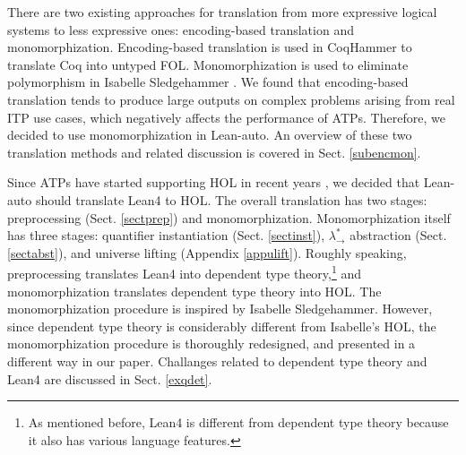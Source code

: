   There are two existing approaches for translation from more expressive
  logical systems to less expressive ones: encoding-based translation and monomorphization.
  Encoding-based translation is used in CoqHammer \cite{Czajka2018HammerFC}
  to translate Coq into untyped FOL. Monomorphization is used to
  eliminate polymorphism in Isabelle Sledgehammer \cite{Blanchette2016HammeringTQ,MonoPaper,Paulson2012ThreeYO}.
  We found that encoding-based translation tends to produce large outputs
  on complex problems arising from real ITP use cases, which negatively affects the performance of ATPs.
  Therefore, we decided to use monomorphization in Lean-auto. An overview of these two
  translation methods and related discussion is covered in Sect. \ref{subencmon}.

  Since ATPs have started supporting HOL in recent years \cite{HOVampire,ZipperpositionMakeWork,HOEProver},
  we decided that Lean-auto should translate Lean4 to HOL. The overall translation has
  two stages: preprocessing (Sect. \ref{sectprep}) and monomorphization.
  Monomorphization itself has three stages: quantifier instantiation (Sect. \ref{sectinst}),
  $\lambda_\to^*$ abstraction (Sect. \ref{sectabst}), and universe lifting (Appendix \ref{appulift}).
  Roughly speaking, preprocessing translates Lean4 into dependent type
  theory,\footnote{As mentioned before, Lean4 is different from
  dependent type theory because it also has various language features.}
  and monomorphization translates dependent type theory into HOL.
  The monomorphization procedure is inspired by Isabelle Sledgehammer.
  However, since dependent type theory is considerably different from
  Isabelle's HOL, the monomorphization procedure is thoroughly redesigned,
  and presented in a different way in our paper. Challanges related to
  dependent type theory and Lean4 are discussed in Sect. \ref{exqdet}.
